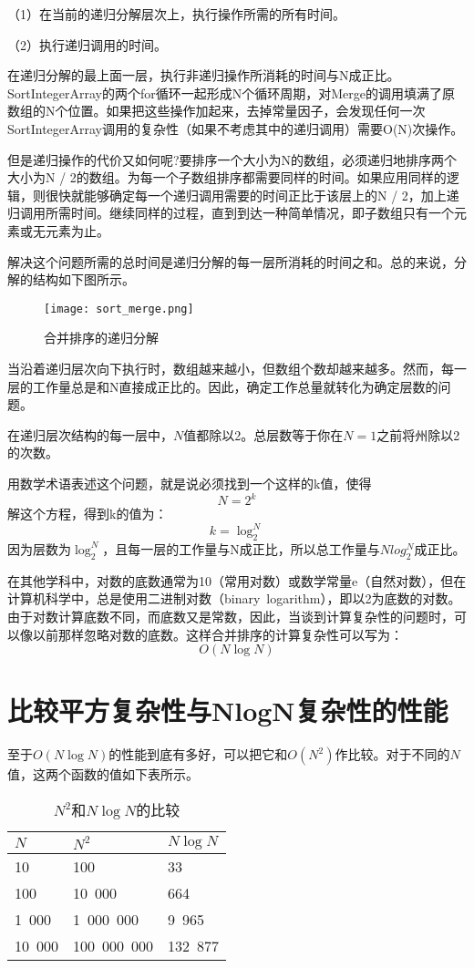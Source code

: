 （1）在当前的递归分解层次上，执行操作所需的所有时间。

（2）执行递归调用的时间。

在递归分解的最上面一层，执行非递归操作所消耗的时间与N成正比。SortIntegerArray的两个for循环一起形成N个循环周期，对Merge的调用填满了原数组的N个位置。如果把这些操作加起来，去掉常量因子，会发现任何一次SortIntegerArray调用的复杂性（如果不考虑其中的递归调用）需要O(N)次操作。

但是递归操作的代价又如何呢?要排序一个大小为N的数组，必须递归地排序两个大小为N / 2的数组。为每一个子数组排序都需要同样的时间。如果应用同样的逻辑，则很快就能够确定每一个递归调用需要的时间正比于该层上的N / 2，加上递归调用所需时间。继续同样的过程，直到到达一种简单情况，即子数组只有一个元素或无元素为止。

解决这个问题所需的总时间是递归分解的每一层所消耗的时间之和。总的来说，分解的结构如下图所示。
\begin{figure}[!h]
\centering
\texttt{[image: sort\_merge.png]}
\caption{合并排序的递归分解}
\end{figure}
当沿着递归层次向下执行时，数组越来越小，但数组个数却越来越多。然而，每一层的工作量总是和N直接成正比的。因此，确定工作总量就转化为确定层数的问题。

在递归层次结构的每一层中，$N$值都除以2。总层数等于你在$N=1$之前将州除以2的次数。

用数学术语表述这个问题，就是说必须找到一个这样的k值，使得
\[N=2^k\]
解这个方程，得到k的值为：
\[k=\log_2^N\]
因为层数为$\log_2^N$，且每一层的工作量与N成正比，所以总工作量与$Nlog_2^N$成正比。

在其他学科中，对数的底数通常为10（常用对数）或数学常量e（自然对数），但在计算机科学中，总是使用二进制对数（binary~logarithm），即以2为底数的对数。由于对数计算底数不同，而底数又是常数，因此，当谈到计算复杂性的问题时，可以像以前那样忽略对数的底数。这样合并排序的计算复杂性可以写为：
\[O(N\log N)\]

\section{比较平方复杂性与NlogN复杂性的性能}

至于$O(N\log N)$的性能到底有多好，可以把它和$O(N^2)$作比较。对于不同的$N$值，这两个函数的值如下表所示。
\begin{table}[!h]
\centering
\caption{ $N^2$和$N\log N$的比较}
\begin{tabular}{|l|l|l|}
\hline
$N$				& $N^2$			&  $N\log N$		\\
\hline
10					& 100				& 33				\\
\hline
100 				& 10~000		& 664				\\
\hline
1~000				& 1~000~000	& 9~965			\\
\hline
10~000			& 100~000~000& 132~877		\\
\hline
\end{tabular}
\end{table}

